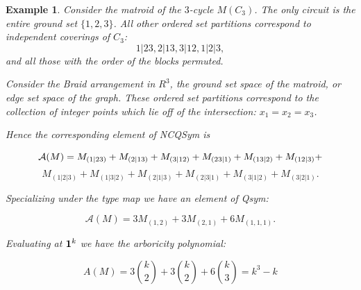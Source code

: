 \documentclass[12pt,reqno]{amsart}
\numberwithin{definition}{section}
\newtheorem{example}[definition]{Example}
\begin{document}
\begin{example}

Consider the matroid of the $3$-cycle $M(C_3)$.  The only circuit is the entire ground set $\{1,2,3\}$.  All other ordered set partitions correspond to independent coverings of $C_3$: 
$$1|23, 2|13, 3|12, 1|2|3,$$
and all those with the order of the blocks permuted. 

Consider the Braid arrangement in $R^3$, the ground set space of the
matroid, or edge set space of the graph.  These ordered set partitions
correspond to the collection of integer points which lie off of the
intersection: $x_1 = x_2 = x_3$.


 Hence the corresponding element of NCQSym is 

$${\bf{{\mathcal A}}}(M) = M_{(1|23)} + M_{(2|13)} + M_{(3|12)} + M_{(23|1)} + M_{(13|2)} +  M_{(12|3)} + $$ $$ M_{(1|2|3)} + M_{(1|3|2)}
+ M_{(2|1|3)} + M_{(2|3|1)} + M_{(3|1|2)} + M_{(3|2|1)}. $$

\noindent Specializing under the type map we have an element of Qsym:

$${\mathcal A}(M) = 3 M_{(1,2)} + 3 M_{(2,1)} + 6 M_{(1,1,1)}. $$

\noindent Evaluating at ${\bf 1}^k $ we have the arboricity polynomial:

$$ A(M) = 3 { k \choose 2} + 3 { k \choose 2} + 6 { k \choose 3} = k^3 - k $$

\end{example}



 

 
\end{document}

